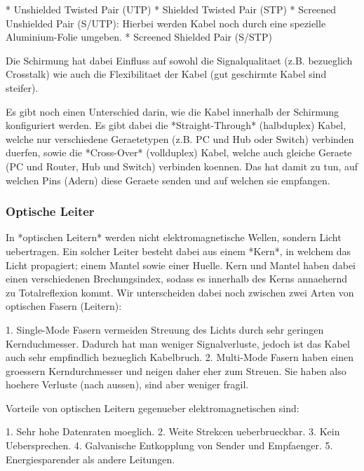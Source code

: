 * Unshielded Twisted Pair (UTP)
* Shielded Twisted Pair (STP)
* Screened Unshielded Pair (S/UTP): Hierbei werden Kabel noch durch eine
  spezielle Aluminium-Folie umgeben.
* Screened Shielded Pair (S/STP)

Die Schirmung hat dabei Einfluss auf sowohl die Signalqualitaet (z.B. bezueglich
Crosstalk) wie auch die Flexibilitaet der Kabel (gut geschirmte Kabel sind
steifer).

Es gibt noch einen Unterschied darin, wie die Kabel innerhalb der Schirmung
konfiguriert werden. Es gibt dabei die *Straight-Through* (halbduplex) Kabel,
welche nur verschiedene Geraetetypen (z.B. PC und Hub oder Switch) verbinden
duerfen, sowie die *Cross-Over* (vollduplex) Kabel, welche auch gleiche Geraete (PC und
Router, Hub und Switch) verbinden koennen. Das hat damit zu tun, auf welchen
Pins (Adern) diese Geraete senden und auf welchen sie empfangen.

\subsubsection{ Optische Leiter}

In *optischen Leitern* werden nicht elektromagnetische Wellen, sondern Licht
uebertragen. Ein solcher Leiter besteht dabei aus einem *Kern*, in welchem das
Licht propagiert; einem Mantel sowie einer Huelle. Kern und Mantel haben dabei
einen verschiedenen Brechungsindex, sodass es innerhalb des Kerns annaehernd zu
Totalreflexion kommt. Wir unterscheiden dabei noch zwischen zwei Arten von
optischen Fasern (Leitern):

1. Single-Mode Fasern vermeiden Streuung des Lichts durch sehr geringen
   Kernduchmesser. Dadurch hat man weniger Signalverluste, jedoch ist das Kabel
   auch sehr empfindlich bezueglich Kabelbruch.
2. Multi-Mode Fasern haben einen groessern Kerndurchmesser und neigen daher eher
   zum Streuen. Sie haben also hoehere Verluste (nach aussen), sind aber weniger
   fragil.

Vorteile von optischen Leitern gegenueber elektromagnetischen sind:

1. Sehr hohe Datenraten moeglich.
2. Weite Strekcen ueberbrueckbar.
3. Kein Uebersprechen.
4. Galvanische Entkopplung von Sender und Empfaenger.
5. Energiesparender als andere Leitungen.
